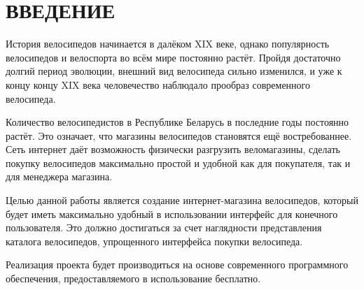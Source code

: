 \section*{ВВЕДЕНИЕ}

История велосипедов начинается в далёком XIX веке, однако популярность велосипедов
и велоспорта во всём мире постоянно растёт. Пройдя достаточно долгий период эволюции,
внешний вид велосипеда сильно изменился, и уже к концу концу XIX века человечество
наблюдало прообраз современного велосипеда.

Количество велосипедистов в Республике Беларусь в последние годы постоянно растёт.
Это означает, что магазины велосипедов становятся ещё востребованнее. Сеть интернет
даёт возможность физически разгрузить веломагазины, сделать покупку велосипедов
максимально простой и удобной как для покупателя, так и для менеджера магазина.

Целью данной работы является создание интернет-магазина велосипедов, который будет
иметь максимально удобный в использовании интерфейс для конечного пользователя.
Это должно достигаться за счет наглядности представления каталога велосипедов,
упрощенного интерфейса покупки велосипеда.

Реализация проекта будет производиться на основе современного программного
обеспечения, предоставляемого в использование бесплатно.

\pagebreak

